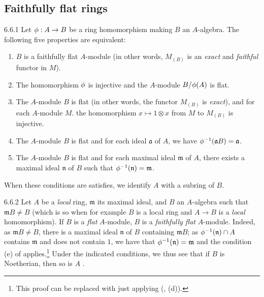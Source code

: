 \subsection{Faithfully flat rings}
\label{0-prelim-6.6}

\begin{env}{6.6.1}
\label{env-0.6.6.1}
Let $\phi:A\to B$ be a ring homomorphism making $B$ an $A$-algebra. The following five
properties are equivalent:
\begin{enumerate}[label=(\alph*)]
  \item $B$ is a faithfully flat $A$-module (in other words, $M_{(B)}$ is an \emph{exact}
        and \emph{faithful} functor in $M$).
  \item The homomorphism $\phi$ is injective and the $A$-module $B/\phi(A)$ is flat.
  \item The $A$-module $B$ is flat (in other words, the functor $M_{(B)}$ is \emph{exact}),
        and for each $A$-module $M$. the homomorphism $x\mapsto 1\otimes x$ from $M$ to
        $M_{(B)}$ is injective.
  \item The $A$-module $B$ is flat and for each ideal $\mathfrak{a}$ of $A$, we have
        $\phi^{-1}(\mathfrak{a}B)=\mathfrak{a}$.
  \item The $A$-module $B$ is flat and for each maximal ideal $\mathfrak{m}$ of $A$, there
        exists a maximal ideal $\mathfrak{n}$ of $B$ such that
        $\phi^{-1}(\mathfrak{n})=\mathfrak{m}$.
\end{enumerate}

When these conditions are satisfies, we identify $A$ with a subring of $B$.
\end{env}

\begin{env}{6.6.2}
\label{env-0.6.6.2}
Let $A$ be a \emph{local} ring, $\mathfrak{m}$ its maximal ideal, and $B$ an $A$-algebra such
that $\mathfrak{m}B\neq B$ (which is so when for example $B$ is a local ring and $A\to B$ is
a \emph{local} homomorphism). If $B$ is a \emph{flat} $A$-module, $B$ is a \emph{faithfully
flat} $A$-module. Indeed, as $\mathfrak{m}B\neq B$, there is a maximal ideal $\mathfrak{n}$
of $B$ containing $\mathfrak{m}B$; as $\phi^{-1}(\mathfrak{n})\cap A$ contains
$\mathfrak{m}$ and does not contain $1$, we have that $\phi^{-1}(\mathfrak{n})=\mathfrak{m}$
and the condition (e) of  applies.\footnote{This proof can be replaced with
just applying (, (d)).} Under the indicated conditions, we thus see that if $B$
is Noetherian, then so is $A$ .
\end{env}

